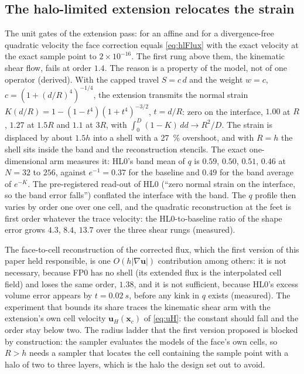 \documentclass[preprint,3p,11pt]{elsarticle}
\newcommand{\bu}{\mathbf{u}}
\newcommand{\bx}{\mathbf{x}}
\begin{document}
\subsection{The halo-limited extension relocates the strain}
\label{sec:disc-hl}
The unit gates of the extension pass: for an affine and for a divergence-free quadratic
velocity the face correction equals \eqref{eq:hlFlux} with the exact velocity at the exact
sample point to $2\times10^{-16}$. The first rung above them, the kinematic shear flow,
fails at order $1.4$. The reason is a property of the model, not of one operator
(derived). With the capped travel $S=c\,d$ and the weight $w=c$,
$c=(1+(d/R)^4)^{-1/4}$, the extension transmits the normal strain
$K(d/R)=1-(1-t^4)(1+t^4)^{-3/2}$, $t=d/R$: zero on the interface, $1.00$ at $R$, $1.27$
at $1.5R$ and $1.1$ at $3R$, with $\int_0^D(1-K)\,dd\to R^2/D$. The strain is displaced
by about $1.5h$ into a shell with a \SI{27}{\percent} overshoot, and with $R=h$ the shell
sits inside the band and the reconstruction stencils. The exact one-dimensional arm
measures it: HL0's band mean of $q$ is $0.59$, $0.50$, $0.51$, $0.46$ at $N=32$ to $256$,
against $e^{-1}=0.37$ for the baseline and $0.49$ for the band average of $e^{-K}$. The
pre-registered read-out of HL0 (``zero normal strain on the interface, so the band
error falls'') conflated the interface with the band. The $q$ profile then varies by
order one over one cell, and the quadratic reconstruction at the feet is first order
whatever the trace velocity: the HL0-to-baseline ratio of the shape error grows $4.3$,
$8.4$, $13.7$ over the three shear rungs (measured).

The face-to-cell reconstruction of the corrected flux, which the first version of this
paper held responsible, is one $O(h|\nabla\bu|)$ contribution among others: it is not
necessary, because FP0 has no shell (its extended flux is the interpolated cell field)
and loses the same order, $1.38$, and it is not sufficient, because HL0's excess volume
error appears by $t=\SI{0.02}{s}$, before any kink in $q$ exists (measured). The
experiment that bounds its share traces the kinematic shear arm with the extension's own
cell velocity $\bu_H(\bx_c)$ of \eqref{eq:uH}: the constant should fall and the order
stay below two. The radius ladder that the first version proposed is blocked by
construction: the sampler evaluates the models of the face's own cells, so $R>h$ needs
a sampler that locates the cell containing the sample point with a halo of two to three
layers, which is the halo the design set out to avoid.
\end{document}
